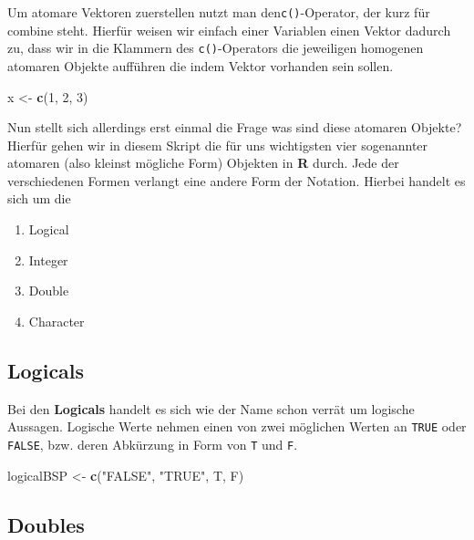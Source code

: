 \documentclass[
]{book}
\newenvironment{Shaded}{\begin{snugshade}}{\end{snugshade}}
\newcommand{\DecValTok}[1]{\textcolor[rgb]{0.00,0.00,0.81}{#1}}
\newcommand{\KeywordTok}[1]{\textcolor[rgb]{0.13,0.29,0.53}{\textbf{#1}}}
\newcommand{\NormalTok}[1]{#1}
\newcommand{\StringTok}[1]{\textcolor[rgb]{0.31,0.60,0.02}{#1}}
\providecommand{\tightlist}{%
  \setlength{\itemsep}{0pt}\setlength{\parskip}{0pt}}
\begin{document}
Um atomare Vektoren zuerstellen nutzt man den\texttt{c()}-Operator, der kurz für combine steht.
Hierfür weisen wir einfach einer Variablen einen Vektor dadurch zu, dass wir in die Klammern des \texttt{c()}-Operators die jeweiligen homogenen atomaren Objekte aufführen die indem Vektor vorhanden sein sollen.

\begin{Shaded}
\begin{Highlighting}[]
\NormalTok{x <-}\StringTok{ }\KeywordTok{c}\NormalTok{(}\DecValTok{1}\NormalTok{, }\DecValTok{2}\NormalTok{, }\DecValTok{3}\NormalTok{)}
\end{Highlighting}
\end{Shaded}

Nun stellt sich allerdings erst einmal die Frage was sind diese atomaren Objekte?
Hierfür gehen wir in diesem Skript die für uns wichtigsten vier sogenannter atomaren (also kleinst mögliche Form) Objekten in \textbf{R} durch.
Jede der verschiedenen Formen verlangt eine andere Form der Notation. Hierbei handelt es sich um die

\begin{enumerate}
\def\labelenumi{\arabic{enumi}.}
\tightlist
\item
  Logical
\item
  Integer
\item
  Double
\item
  Character
\end{enumerate}

\hypertarget{logicals}{%
\subsection{Logicals}\label{logicals}}

Bei den \textbf{Logicals} handelt es sich wie der Name schon verrät um logische Aussagen.
Logische Werte nehmen einen von zwei möglichen Werten an \texttt{TRUE} oder \texttt{FALSE}, bzw. deren Abkürzung in Form von \texttt{T} und \texttt{F}.

\begin{Shaded}
\begin{Highlighting}[]
\NormalTok{logicalBSP <-}\StringTok{ }\KeywordTok{c}\NormalTok{(}\StringTok{"FALSE"}\NormalTok{, }\StringTok{"TRUE"}\NormalTok{, T, F)}
\end{Highlighting}
\end{Shaded}

\hypertarget{doubles}{%
\subsection{Doubles}\label{doubles}}
\end{document}
